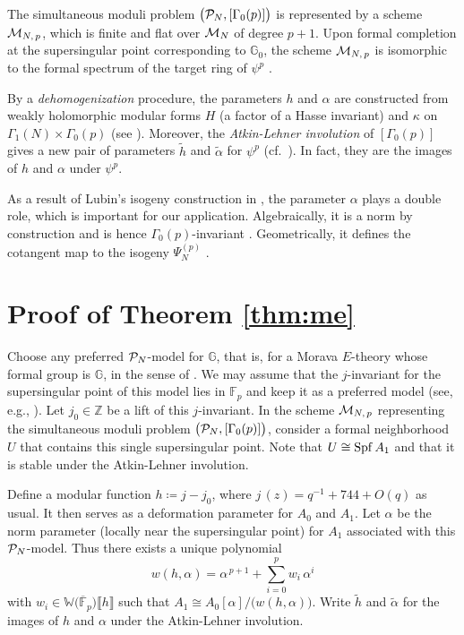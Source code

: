 \documentclass{gtpart}
\theoremstyle{definition}
\theoremstyle{remark}
\newcommand{\mb}[1]{\mathbb{#1}}
\newcommand{\Spf}{{\rm Spf\thinspace}}
\newcommand{\cF}{\overline {\mb F}}
\newcommand{\CM}{{\cal M}}
\newcommand{\CP}{{\cal P}}
\newcommand{\BF}{{\mb F}}
\newcommand{\BG}{{\mb G}}
\newcommand{\BW}{{\mb W}}
\newcommand{\BZ}{{\mb Z}}
\newcommand{\tA}{\widetilde{\A}}
\renewcommand{\th}{\widetilde{h}}
\newcommand{\A}{\alpha}
\newcommand{\G}{\Gamma}
\newcommand{\K}{\kappa}
\newcommand{\ce}{\coloneqq}
\newcommand{\lb}{\llbracket}
\newcommand{\rb}{\rrbracket}
\renewcommand{\=}{\approx}
\renewcommand{\-}{\sim}
\numberwithin{equation}{section}
\begin{document}
The simultaneous moduli problem $\big(\CP_N,[\G_0(p)]\big)$ is represented by a 
scheme $\CM_{N,\,p}$, which is finite and flat over $\CM_N$ of degree $p + 1$.  
Upon formal completion at the supersingular point corresponding to $\BG_0$, the 
scheme $\CM_{N,\,p}$ is isomorphic to the formal spectrum of the target ring of 
$\psi^p$ \cite[Theorem 1.1]{Str98}.  

By a {\em dehomogenization} procedure, the parameters $h$ and $\A$ are 
constructed from weakly holomorphic modular forms $H$ (a factor of a Hasse 
invariant) and $\K$ on $\G_1(N) \times \G_0(p)$ (see 
\cite[Proposition 2.9 and Examples 2.6 and 3.5]{ho}).  Moreover, the 
{\em Atkin-Lehner involution} of $[\G_0(p)]$ gives a new pair of parameters 
$\th$ and $\tA$ for $\psi^p$ (cf.~\cite[11.3.1]{KM}).  In fact, they are the 
images of $h$ and $\A$ under $\psi^p$.  

As a result of Lubin's isogeny construction in 
\cite[proof of Theorem 1.4]{Lubin}, the parameter $\A$ plays a double role, 
which is important for our application.  Algebraically, it is a norm by 
construction and is hence $\G_0(p)$-invariant \cite[Construction 3.1\,(ii)]{ho}.  
Geometrically, it defines the cotangent map to the isogeny $\Psi_N^{(p)}$ 
\cite[Remark 3.2]{ho}.  



\section{Proof of Theorem \ref{thm:me}}
\label{sec:pf}

Choose any preferred $\CP_N$-model for $\BG$, that is, for a Morava $E$-theory 
whose formal group is $\BG$, in the sense of \cite[Definition 3.29]{ho}.  We may 
assume that the $j$-invariant for the supersingular point of this model lies in 
$\BF_p$ and keep it as a preferred model (see, e.g., 
\cite[Theorem 14.18 and Proposition 14.15]{Cox}).  Let $j_0 \in \BZ$ be a lift 
of this $j$-invariant.  In the scheme $\CM_{N,\,p}$ representing the 
simultaneous moduli problem $\big(\CP_N,[\G_0(p)]\big)$, consider a formal 
neighborhood $U$ that contains this single supersingular point.  Note that 
$U \cong \Spf A_1$ and that it is stable under the Atkin-Lehner involution.  

Define a modular function $h \ce j - j_0$, where $j\,(z) = q^{-1} + 744 + O(q)$ 
as usual.  It then serves as a deformation parameter for $A_0$ and $A_1$.  Let 
$\A$ be the norm parameter (locally near the supersingular point) for $A_1$ 
associated with this $\CP_N$-model.  Thus there exists a unique polynomial 
\begin{equation}
 \label{w}
 w(h,\A) = \A^{\,p + 1} + \sum_{i = 0}^p w_i \, \A^i 
\end{equation}
with $w_i \in \BW\big(\cF_p\big)\lb h \rb$ such that 
$A_1 \cong A_0[\A] / \big(w(h,\A)\big)$.  Write $\th$ and $\tA$ for the images 
of $h$ and $\A$ under the Atkin-Lehner involution.  
\end{document}
